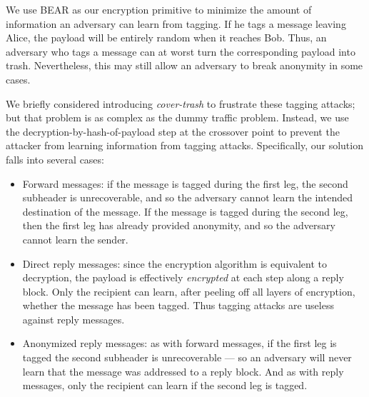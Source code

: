 \documentclass{llncs}
\begin{document}

We use BEAR as our encryption primitive to minimize the amount of
information an adversary can learn from tagging. If he tags a message
leaving Alice, the payload will be entirely random when it reaches
Bob.  Thus, an adversary who tags a message can at worst turn the
corresponding payload into trash.  
Nevertheless, this may still allow an adversary to
break anonymity in some cases.

We briefly considered introducing \emph{cover-trash} to frustrate
these tagging attacks; but that problem is as complex as the dummy
traffic problem. Instead, we use the decryption-by-hash-of-payload step at the
crossover point to prevent the attacker from learning information from
tagging attacks.  Specifically, our solution falls into several cases:

\begin{itemize}
\item Forward messages: if the message is tagged during the first leg,
the second subheader is unrecoverable, and so the adversary cannot
learn the intended destination of the message. If the message is tagged
during the second leg, then the first leg has already provided anonymity,
and so the adversary cannot learn the sender.
\item Direct reply messages: since the encryption algorithm is equivalent to
decryption, the payload is effectively \emph{encrypted} at each step
along a reply block. Only the recipient can learn, after peeling off
all layers of encryption, whether the message has been tagged. Thus
tagging attacks are useless against reply messages.
\item Anonymized reply messages: as with forward messages, if the first leg
is tagged the second subheader is unrecoverable --- so an adversary will
never learn that the message was addressed to a reply block. And as with
reply messages, only the recipient can learn if the second leg is tagged.
\end{itemize}
\end{document}
